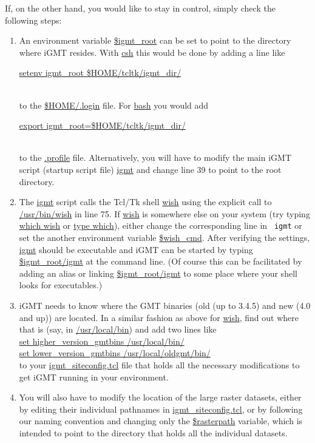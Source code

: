 \documentclass[11pt]{article}
\begin{document}
If, on the other hand, you would like to stay in control, simply check
the following steps:
\begin{enumerate}
  
\item An environment variable \url{$igmt_root} can be set to
  point to the directory where iGMT resides. With \url{csh} this would
  be done by adding a line like\\
  \centerline{\url{setenv igmt_root $HOME/tcltk/igmt_dir/}}\\
  to the \url{$HOME/.login} file. For \url{bash} you would add\\
  \centerline{\url{export igmt_root=$HOME/tcltk/igmt_dir/}}\\
  to the \url{.profile} file. Alternatively, you will have to modify
  the main iGMT script (startup script file) \url{igmt} and change
  line 39 to point to the root directory.
  
\item The \url{igmt} script calls the Tcl/Tk shell \url{wish} using
  the explicit call to \url{/usr/bin/wish} in line 75. If \url{wish}
  is somewhere else on your system (try typing \url{which wish} or
  \url{type which}), either change the corresponding line in {\tt
    igmt} or set the another environment variable \url{$wish_cmd}.
  After verifying the settings, \url{igmt} should be executable and
  iGMT can be started by typing \url{$igmt_root/igmt} at the command
  line. (Of course this can be facilitated by adding an alias or
  linking \url{$igmt_root/igmt} to some place where your shell looks
  for executables.)
  
\item iGMT needs to know where the GMT binaries (old (up to 3.4.5) and
  new (4.0 and up)) are located. In a similar fashion as above for
  \url{wish}, find out where that is (say, in \url{/usr/local/bin})
  and add two lines like\\
  \url{set higher_version_gmtbins /usr/local/bin/}\\
  \url{set lower_version_gmtbins /usr/local/oldgmt/bin/}\\
  to your \url{igmt_siteconfig.tcl} file that holds all the necessary
  modifications to get iGMT running in your environment.


\item You will also have to modify the location of the large raster
  datasets, either by editing their individual pathnames in
  \url{igmt_siteconfig.tcl}, or by following our naming convention and
  changing only the \url{$rasterpath} variable, which is intended to
  point to the directory that holds all the individual datasets.
\end{enumerate}
\end{document}
